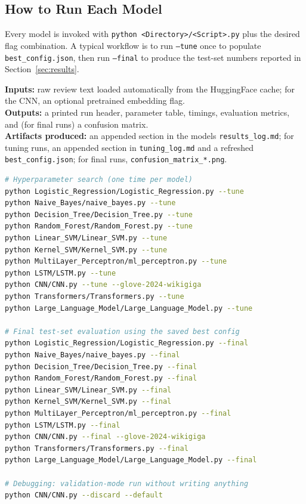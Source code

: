 \documentclass[12pt]{article}
\begin{document}
\subsection{How to Run Each Model}

Every model is invoked with \texttt{python <Directory>/<Script>.py} plus the desired flag combination. A typical workflow is to run \texttt{--tune} once to populate \texttt{best\_config.json}, then run \texttt{--final} to produce the test-set numbers reported in Section~\ref{sec:results}.

\textbf{Inputs:} raw review text loaded automatically from the HuggingFace cache; for the CNN, an optional pretrained embedding flag.\\[0.5em]
\textbf{Outputs:} a printed run header, parameter table, timings, evaluation metrics, and (for final runs) a confusion matrix.\\[0.5em]
\textbf{Artifacts produced:} an appended section in the models \texttt{results\_log.md}; for tuning runs, an appended section in \texttt{tuning\_log.md} and a refreshed \texttt{best\_config.json}; for final runs, \texttt{confusion\_matrix\_*.png}.

\vspace{0.5em}

\begin{lstlisting}[language=bash]
# Hyperparameter search (one time per model)
python Logistic_Regression/Logistic_Regression.py --tune
python Naive_Bayes/naive_bayes.py --tune
python Decision_Tree/Decision_Tree.py --tune
python Random_Forest/Random_Forest.py --tune
python Linear_SVM/Linear_SVM.py --tune
python Kernel_SVM/Kernel_SVM.py --tune
python MultiLayer_Perceptron/ml_perceptron.py --tune
python LSTM/LSTM.py --tune
python CNN/CNN.py --tune --glove-2024-wikigiga
python Transformers/Transformers.py --tune
python Large_Language_Model/Large_Language_Model.py --tune

# Final test-set evaluation using the saved best config
python Logistic_Regression/Logistic_Regression.py --final
python Naive_Bayes/naive_bayes.py --final
python Decision_Tree/Decision_Tree.py --final
python Random_Forest/Random_Forest.py --final
python Linear_SVM/Linear_SVM.py --final
python Kernel_SVM/Kernel_SVM.py --final
python MultiLayer_Perceptron/ml_perceptron.py --final
python LSTM/LSTM.py --final
python CNN/CNN.py --final --glove-2024-wikigiga
python Transformers/Transformers.py --final
python Large_Language_Model/Large_Language_Model.py --final

# Debugging: validation-mode run without writing anything
python CNN/CNN.py --discard --default
\end{lstlisting}
\end{document}
